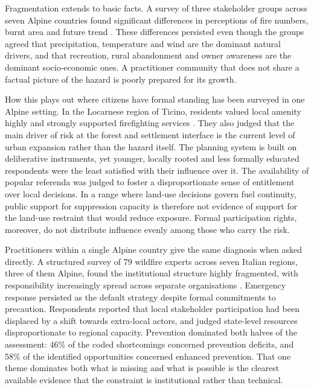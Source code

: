 \documentclass[11pt,a4paper]{article}
\begin{document}
Fragmentation extends to basic facts. A survey of three stakeholder groups across seven Alpine countries found significant differences in perceptions of fire numbers, burnt area and future trend \citep{hoang_stakeholders_2026}. These differences persisted even though the groups agreed that precipitation, temperature and wind are the dominant natural drivers, and that recreation, rural abandonment and owner awareness are the dominant socio-economic ones. A practitioner community that does not share a factual picture of the hazard is poorly prepared for its growth.

How this plays out where citizens have formal standing has been surveyed in one Alpine setting. In the Locarnese region of Ticino, residents valued local amenity highly and strongly supported firefighting services \citep{bardsley_wildfire_2021}. They also judged that the main driver of risk at the forest and settlement interface is the current level of urban expansion rather than the hazard itself. The planning system is built on deliberative instruments, yet younger, locally rooted and less formally educated respondents were the least satisfied with their influence over it. The availability of popular referenda was judged to foster a disproportionate sense of entitlement over local decisions. In a range where land-use decisions govern fuel continuity, public support for suppression capacity is therefore not evidence of support for the land-use restraint that would reduce exposure. Formal participation rights, moreover, do not distribute influence evenly among those who carry the risk.

Practitioners within a single Alpine country give the same diagnosis when asked directly. A structured survey of 79 wildfire experts across seven Italian regions, three of them Alpine, found the institutional structure highly fragmented, with responsibility increasingly spread across separate organisations \citep{kirschner_governance_2024}. Emergency response persisted as the default strategy despite formal commitments to precaution. Respondents reported that local stakeholder participation had been displaced by a shift towards extra-local actors, and judged state-level resources disproportionate to regional capacity. Prevention dominated both halves of the assessment: 46\% of the coded shortcomings concerned prevention deficits, and 58\% of the identified opportunities concerned enhanced prevention. That one theme dominates both what is missing and what is possible is the clearest available evidence that the constraint is institutional rather than technical.
\end{document}
